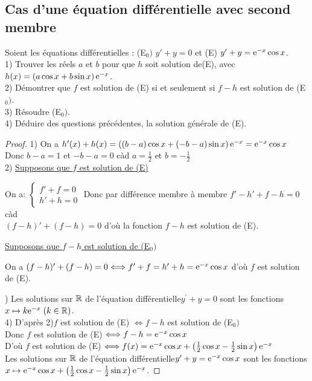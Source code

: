 \subsection*{Cas d'une équation différentielle avec second membre}
\begin{exercice}
  Soient les équations différentielles :\; (E$_{0})$ \;$  y'+y=0 $\; et \; (E) \;$  y'+y=\mathrm{e}^{-x}\cos x $.\\
1)  Trouver les réels $ a$ et $b $ pour que $ h $  soit solution de(E), avec $ h(x)=\left(a\cos x+b\sin x\right)\mathrm{e}^{-x} $.\\
2) Démontrer  que   $ f $  est solution de (E)   si et seulement si  $ f-h $  est solution de  (E$_{0})$.\\
3) Résoudre (E$_{0})$.\\
4) Déduire des questions précédentes, la solution générale de (E).
\end{exercice}

\begin{proof}
  1)\; On a $ h^{\prime}(x)+h(x)=\left((b-a)\cos x+(-b-a)\sin x\right)\mathrm{e}^{-x} =\mathrm{e}^{-x}\cos x$ \\Donc $ b-a=1 $  et  $ -b-a=0 $ càd $a=\frac{1}{2} $ et $ b=-\frac{1}{2}$\\
  2)\; \underline{Supposons que $ f $  est solution de (E)}
  
  \medskip
  On a:\;  $  \begin{cases}  
f'+f=0 \\
h'+h=0
\end{cases} $ 
Donc par différence membre à membre \; $ f'-h'+f-h=0 $\; càd\\$ (f-h)'+(f-h)=0$\; d'où  la fonction $ f-h $  est solution de (E).

\medskip
\underline{Supposons que $ f-h $ est solution de  (E$_{0})$}

\medskip
On a \; $ (f-h)'+(f-h)=0   \Longleftrightarrow f'+f =h'+h=\mathrm{e}^{-x}\cos x$\; d'où  $ f $  est solution de (E).

)\; Les solutions sur $ \mathbb{R} $ de l'équation différentielle\;$ y^{\prime}+y=0 $\; sont les fonctions \; $ x\mapsto k\mathrm{e}^{-x}\; (k\in\mathbb{R}) $.\\
4)\; D'après  2)\;$ f $ est solution de (E) $ \Longleftrightarrow f-h $  est solution de (E$_{0})$\\
Donc $ f $ est solution de (E) $ \Longleftrightarrow f-h =\mathrm{e}^{-x}\cos x$  \\
D'où $ f $ est solution de (E) $ \Longleftrightarrow f(x) =\mathrm{e}^{-x}\cos x  +\left(\frac{1}{2}\cos x-\frac{1}{2}\sin x\right)\mathrm{e}^{-x} $  \\
Les solutions sur $ \mathbb{R} $ de l'équation différentielle\;$ y^{\prime}+y= \mathrm{e}^{-x}\cos x$\; sont les fonctions \\ $ x\mapsto \mathrm{e}^{-x}\cos x  +\left(\frac{1}{2}\cos x-\frac{1}{2}\sin x\right)\mathrm{e}^{-x} $.
\end{proof}

